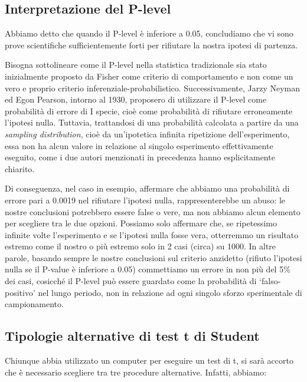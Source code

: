 \documentclass[a4paper,12pt,oneside]{book}
\begin{document}
\hypertarget{interpretazione-del-p-level}{%
\subsection{Interpretazione del P-level}\label{interpretazione-del-p-level}}

Abbiamo detto che quando il P-level è inferiore a 0.05, concludiamo che vi sono prove scientifiche sufficientemente forti per rifiutare la nostra ipotesi di partenza.

Bisogna sottolineare come il P-level nella statistica tradizionale sia stato inizialmente proposto da Fisher come criterio di comportamento e non come un vero e proprio criterio inferenziale-probabilistico. Successivamente, Jarzy Neyman ed Egon Pearson, intorno al 1930, proposero di utilizzare il P-level come probabilità di errore di I specie, cioè come probabilità di rifiutare erroneamente l'ipotesi nulla. Tuttavia, trattandosi di una probabilità calcolata a partire da una \emph{sampling distribution}, cioè da un'ipotetica infinita ripetizione dell'esperimento, essa non ha alcun valore in relazione al singolo esperimento effettivamente eseguito, come i due autori menzionati in precedenza hanno esplicitamente chiarito.

Di conseguenza, nel caso in esempio, affermare che abbiamo una probabilità di errore pari a 0.0019 nel rifiutare l'ipotesi nulla, rappresenterebbe un abuso: le nostre conclusioni potrebbero essere false o vere, ma non abbiamo alcun elemento per scegliere tra le due opzioni. Possiamo solo affermare che, se ripetessimo infinite volte l'esperimento e se l'ipotesi nulla fosse vera, otterremmo un risultato estremo come il nostro o più estremo solo in 2 casi (circa) su 1000. In altre parole, basando sempre le nostre conclusioni sul criterio anzidetto (rifiuto l'ipotesi nulla se il P-value è inferiore a 0.05) commettiamo un errore in non più del 5\% dei casi, cosicché il P-level può essere guardato come la probabilità di `falso-positivo' nel lungo periodo, non in relazione ad ogni singolo sforzo sperimentale di campionamento.

\hypertarget{tipologie-alternative-di-test-t-di-student}{%
\subsection{Tipologie alternative di test t di Student}\label{tipologie-alternative-di-test-t-di-student}}

Chiunque abbia utilizzato un computer per eseguire un test di t, si sarà accorto che è necessario scegliere tra tre procedure alternative. Infatti, abbiamo:
\end{document}
